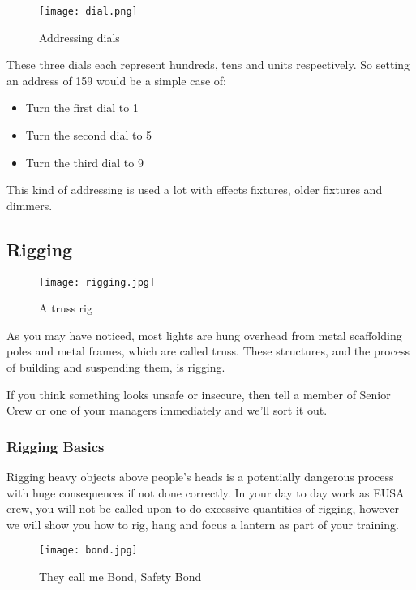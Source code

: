 \documentclass[14pt]{article} %
\let\Oldsubsection\subsection
\renewcommand{\subsection}{\FloatBarrier\Oldsubsection}
\let\Oldsubsubsection\subsubsection
\renewcommand{\subsubsection}{\FloatBarrier\Oldsubsubsection}
\begin{document}
\begin{itemize}
\begin{figure*}[h]
\begin{center}
\texttt{[image: dial.png]}
\caption{Addressing dials}
\label{fig:dial}

\end{center}
\end{figure*}

These three dials each represent hundreds, tens and units respectively. So setting an address of 159 would be a simple case of:
\begin{itemize}
\item	Turn the first dial to 1
\item	Turn the second dial to 5
\item	Turn the third dial to 9
\end{itemize}
This kind of addressing is used a lot with effects fixtures, older fixtures and dimmers.


\end{itemize}

\subsection{Rigging}

\begin{figure*}[h]
\begin{center}

\texttt{[image: rigging.jpg]}
\caption{A truss rig}
\label{fig:rig}

\end{center}
\end{figure*}

As you may have noticed, most lights are hung overhead from metal scaffolding poles and metal frames, which are called truss. These structures, and the process of building and suspending them, is rigging.

If you think something looks unsafe or insecure, then tell a member of Senior Crew or one of your managers immediately and we’ll sort it out.

\subsubsection{Rigging Basics}
Rigging heavy objects above people’s heads is a potentially dangerous process with huge consequences if not done correctly. In your day to day work as EUSA crew, you will not be called upon to do excessive quantities of rigging, however we will show you how to rig, hang and focus a lantern as part of your training. 

\begin{figure*}[h]
\begin{center}

\texttt{[image: bond.jpg]}
\caption{They call me Bond, Safety Bond}
\label{fig:bond}

\end{center}
\end{figure*}
\end{document}
